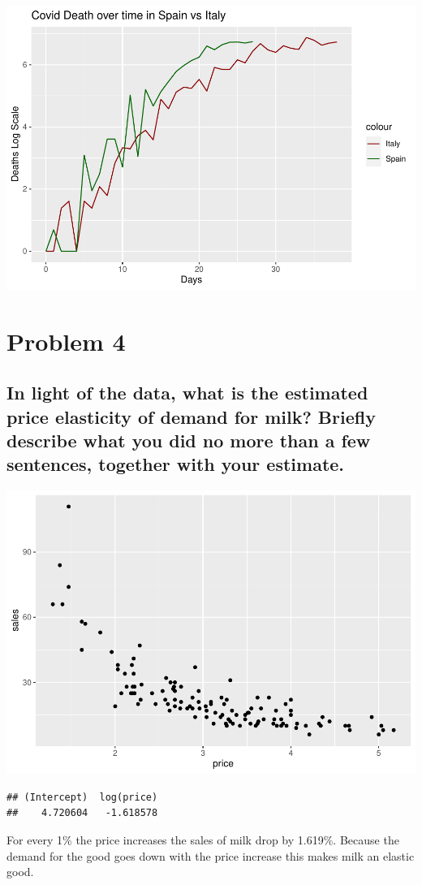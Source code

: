 \documentclass[
]{article}
\begin{document}
\includegraphics{HW3_files/figure-latex/unnamed-chunk-8-1.pdf}

\hypertarget{problem-4}{%
\section{Problem 4}\label{problem-4}}

\hypertarget{in-light-of-the-data-what-is-the-estimated-price-elasticity-of-demand-for-milk-briefly-describe-what-you-did-no-more-than-a-few-sentences-together-with-your-estimate.}{%
\subsection{In light of the data, what is the estimated price elasticity
of demand for milk? Briefly describe what you did no more than a few
sentences, together with your
estimate.}\label{in-light-of-the-data-what-is-the-estimated-price-elasticity-of-demand-for-milk-briefly-describe-what-you-did-no-more-than-a-few-sentences-together-with-your-estimate.}}

\includegraphics{HW3_files/figure-latex/unnamed-chunk-9-1.pdf}

\begin{verbatim}
## (Intercept)  log(price) 
##    4.720604   -1.618578
\end{verbatim}

For every 1\% the price increases the sales of milk drop by 1.619\%.
Because the demand for the good goes down with the price increase this
makes milk an elastic good.
\end{document}
